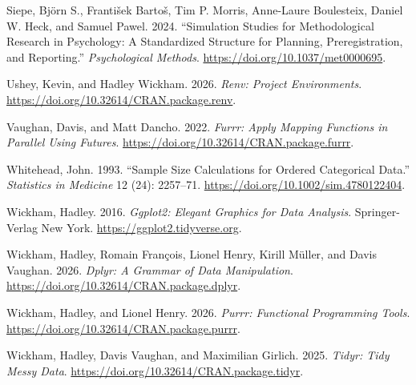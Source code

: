 \documentclass[
  man,
  floatsintext]{apa7}
\newlength{\cslhangindent}
\newenvironment{CSLReferences}[2] %
 {\begin{list}{}{%
  \setlength{\itemindent}{0pt}
  \setlength{\leftmargin}{0pt}
  \setlength{\parsep}{0pt}
  \ifodd #1
   \setlength{\leftmargin}{\cslhangindent}
   \setlength{\itemindent}{-1\cslhangindent}
  \fi
  \setlength{\itemsep}{#2\baselineskip}}}
 {\end{list}}
\begin{document}
\begin{CSLReferences}{1}{0}
Siepe, Björn S., František Bartoš, Tim P. Morris, Anne-Laure Boulesteix,
Daniel W. Heck, and Samuel Pawel. 2024. {``Simulation Studies for
Methodological Research in Psychology: A Standardized Structure for
Planning, Preregistration, and Reporting.''} \emph{Psychological
Methods}. \url{https://doi.org/10.1037/met0000695}.

Ushey, Kevin, and Hadley Wickham. 2026. \emph{Renv: Project
Environments}. \url{https://doi.org/10.32614/CRAN.package.renv}.

Vaughan, Davis, and Matt Dancho. 2022. \emph{Furrr: Apply Mapping
Functions in Parallel Using Futures}.
\url{https://doi.org/10.32614/CRAN.package.furrr}.

Whitehead, John. 1993. {``{Sample Size Calculations for Ordered
Categorical Data}.''} \emph{Statistics in Medicine} 12 (24): 2257--71.
\url{https://doi.org/10.1002/sim.4780122404}.

Wickham, Hadley. 2016. \emph{Ggplot2: Elegant Graphics for Data
Analysis}. Springer-Verlag New York.
\url{https://ggplot2.tidyverse.org}.

Wickham, Hadley, Romain François, Lionel Henry, Kirill Müller, and Davis
Vaughan. 2026. \emph{Dplyr: A Grammar of Data Manipulation}.
\url{https://doi.org/10.32614/CRAN.package.dplyr}.

Wickham, Hadley, and Lionel Henry. 2026. \emph{Purrr: Functional
Programming Tools}. \url{https://doi.org/10.32614/CRAN.package.purrr}.

Wickham, Hadley, Davis Vaughan, and Maximilian Girlich. 2025.
\emph{Tidyr: Tidy Messy Data}.
\url{https://doi.org/10.32614/CRAN.package.tidyr}.

\end{CSLReferences}
\end{document}
